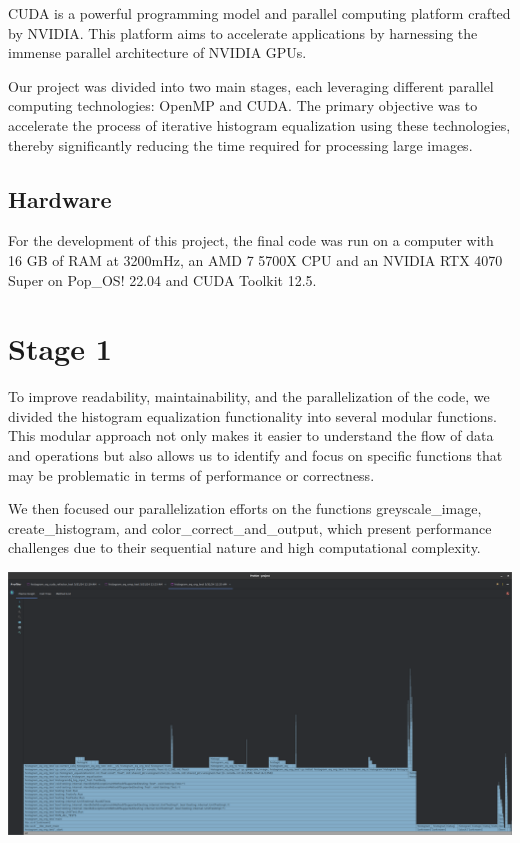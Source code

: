 \documentclass[sigconf]{acmart}
\begin{document}
CUDA is a powerful programming model and parallel computing platform crafted by NVIDIA. This platform aims to accelerate applications by harnessing the immense parallel architecture of NVIDIA GPUs.

Our project was divided into two main stages, each leveraging different parallel computing technologies: OpenMP and CUDA. The primary objective was to accelerate the process of iterative histogram equalization using these technologies, thereby significantly reducing the time required for processing large images.

\subsection{Hardware}

For the development of this project, the final code was run on a computer with 16 GB of RAM at 3200mHz, an AMD 7 5700X CPU and an NVIDIA RTX 4070 Super on Pop\_OS! 22.04 and CUDA Toolkit 12.5.

\section{Stage 1}

To improve readability, maintainability, and the parallelization of the code, we divided the histogram equalization functionality into several modular functions. This modular approach not only makes it easier to understand the flow of data and operations but also allows us to identify and focus on specific functions that may be problematic in terms of performance or correctness.

We then focused our parallelization efforts on the functions greyscale\_image, create\_histogram, and color\_correct\_and\_output, which present performance challenges due to their sequential nature and high computational complexity.

\begin{center}
\includegraphics[width=0.8\linewidth]{vizs/original_function_profiler.png}
\label{sequential_profiler}
\end{center}
\end{document}
